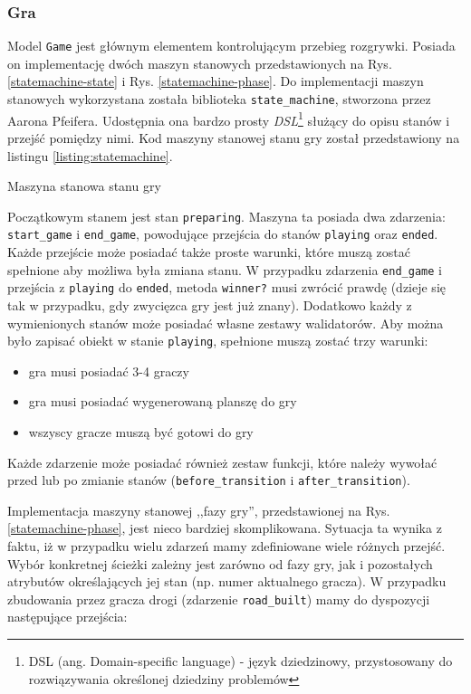 \documentclass[a4paper,12pt]{article}
\providecommand{\imref}[1]{Rys. \ref{#1}} %
\begin{document}
\subsubsection{Gra}
Model \texttt{Game} jest głównym elementem kontrolującym przebieg
rozgrywki. Posiada on implementację dwóch maszyn stanowych
przedstawionych na \imref{statemachine-state} i
\imref{statemachine-phase}. Do implementacji maszyn stanowych
wykorzystana została biblioteka \texttt{state\_machine}, stworzona
przez Aarona Pfeifera. Udostępnia ona bardzo prosty
\emph{DSL}\footnote{DSL (ang. Domain-specific language) - język
  dziedzinowy, przystosowany do rozwiązywania określonej dziedziny
  problemów} służący do opisu stanów i przejść pomiędzy nimi. Kod
maszyny stanowej stanu gry został przedstawiony na listingu
\ref{listing:statemachine}.

\begin{listing}
  
  \caption{Maszyna stanowa stanu gry}
  \label{listing:statemachine}
\end{listing}

Początkowym stanem jest stan \texttt{preparing}.  Maszyna ta posiada
dwa zdarzenia: \texttt{start\_game} i \texttt{end\_game}, powodujące
przejścia do stanów \texttt{playing} oraz \texttt{ended}. Każde
przejście może posiadać także proste warunki, które muszą zostać
spełnione aby możliwa była zmiana stanu. W przypadku zdarzenia
\texttt{end\_game} i przejścia z \texttt{playing} do \texttt{ended},
metoda \texttt{winner?} musi zwrócić prawdę (dzieje się tak w
przypadku, gdy zwycięzca gry jest już znany). Dodatkowo każdy z
wymienionych stanów może posiadać własne zestawy walidatorów. Aby
można było zapisać obiekt w stanie \texttt{playing}, spełnione muszą
zostać trzy warunki:

\begin{itemize}
\item gra musi posiadać 3-4 graczy
\item gra musi posiadać wygenerowaną planszę do gry
\item wszyscy gracze muszą być gotowi do gry
\end{itemize}

Każde zdarzenie może posiadać również zestaw funkcji, które należy
wywołać przed lub po zmianie stanów (\texttt{before\_transition} i
\texttt{after\_transition}).

Implementacja maszyny stanowej ,,fazy gry'', przedstawionej na
\imref{statemachine-phase}, jest nieco bardziej
skomplikowana. Sytuacja ta wynika z faktu, iż w przypadku wielu
zdarzeń mamy zdefiniowane wiele różnych przejść. Wybór konkretnej
ścieżki zależny jest zarówno od fazy gry, jak i pozostałych atrybutów
określających jej stan (np. numer aktualnego gracza). W przypadku
zbudowania przez gracza drogi (zdarzenie \texttt{road\_built}) mamy do
dyspozycji następujące przejścia:
\end{document}
